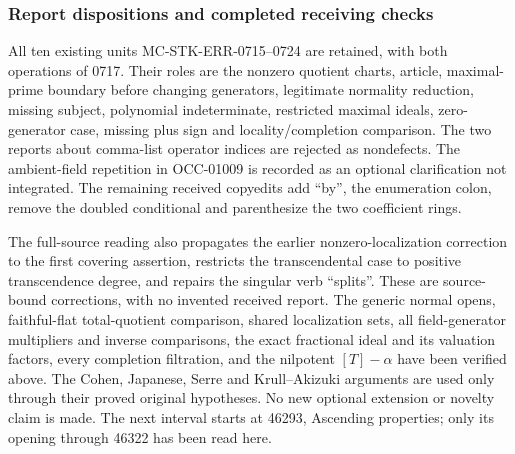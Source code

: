 \subsubsection{Report dispositions and completed receiving checks}\label{algebra-proof-067-report-dispositions-and-completed-receiving-checks}

All ten existing units MC-STK-ERR-0715--0724 are retained, with both operations of 0717. Their roles are the nonzero quotient charts, article, maximal-prime boundary before changing generators, legitimate normality reduction, missing subject, polynomial indeterminate, restricted maximal ideals, zero-generator case, missing plus sign and locality/completion comparison. The two reports about comma-list operator indices are rejected as nondefects. The ambient-field repetition in OCC-01009 is recorded as an optional clarification not integrated. The remaining received copyedits add ``by'', the enumeration colon, remove the doubled conditional and parenthesize the two coefficient rings.

The full-source reading also propagates the earlier nonzero-localization correction to the first covering assertion, restricts the transcendental case to positive transcendence degree, and repairs the singular verb ``splits''. These are source-bound corrections, with no invented received report. The generic normal opens, faithful-flat total-quotient comparison, shared localization sets, all field-generator multipliers and inverse comparisons, the exact fractional ideal and its valuation factors, every completion filtration, and the nilpotent \([T]-\alpha\) have been verified above. The Cohen, Japanese, Serre and Krull--Akizuki arguments are used only through their proved original hypotheses. No new optional extension or novelty claim is made. The next interval starts at 46293, Ascending properties; only its opening through 46322 has been read here.
